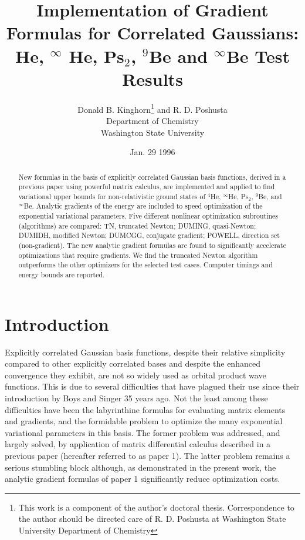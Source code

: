 \documentclass[12pt,thmsa]{article}
\begin{document}
\author{Donald B. Kinghorn\thanks{%
This work is a component of the author's doctoral thesis. Correspondence to
the author should be directed care of R. D. Poshusta at Washington State
University Department of Chemistry } and R. D. Poshusta \\
Department of Chemistry\\
Washington State University}
\title{Implementation of Gradient Formulas for Correlated Gaussians: He, $^\infty $%
He, Ps$_2$, $^9$Be and $^\infty $Be Test Results}
\date{Jan. 29 1996 }
\maketitle

\begin{abstract}
New formulas in the basis of explicitly correlated Gaussian basis functions,
derived in a previous paper using powerful matrix calculus, are implemented
and applied to find variational upper bounds for non-relativistic ground
states of $^4$He, $^\infty $He, Ps$_2$, $^9$Be, and $^\infty $Be. Analytic
gradients of the energy are included to speed optimization of the
exponential variational parameters. Five different nonlinear optimization
subroutines (algorithms) are compared: TN, truncated Newton; DUMING,
quasi-Newton; DUMIDH, modified Newton; DUMCGG, conjugate gradient; POWELL,
direction set (non-gradient). The new analytic gradient formulas are found
to significantly accelerate optimizations that require gradients. We find
the truncated Newton algorithm outperforms the other optimizers for the
selected test cases. Computer timings and energy bounds are reported.
\end{abstract}

\tableofcontents

\section{Introduction}

Explicitly correlated Gaussian basis functions, despite their relative
simplicity compared to other explicitly correlated bases and despite the
enhanced convergence they exhibit, are not so widely used as orbital product
wave functions. This is due to several difficulties that have plagued their
use since their introduction by Boys\cite{Boys} and Singer\cite{Singer1} 35
years ago. Not the least among these difficulties have been the labyrinthine
formulas for evaluating matrix elements and gradients, and the formidable
problem to optimize the many exponential variational parameters in this
basis. The former problem was addressed, and largely solved, by application
of matrix differential calculus described in a previous paper\cite
{Kinghorn95a} (hereafter referred to as paper 1). The latter problem remains
a serious stumbling block although, as demonstrated in the present work, the
analytic gradient formulas of paper 1 significantly reduce optimization
costs.
\end{document}
